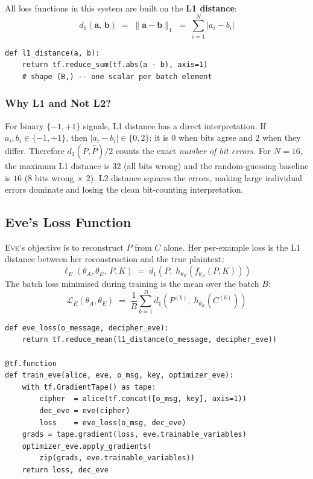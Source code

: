 \documentclass[12pt, a4paper]{article}
\newcommand{\eve}{\textsc{Eve}}
\newcommand{\thetaA}{\theta_{\!A}}
\newcommand{\thetaE}{\theta_{\!E}}
\begin{document}
All loss functions in this system are built on the \textbf{L1 distance}:
%
\begin{equation}
  d_1(\mathbf{a},\, \mathbf{b})
  \;=\; \|\mathbf{a} - \mathbf{b}\|_1
  \;=\; \sum_{i=1}^{N} |a_i - b_i|
  \label{eq:l1_full}
\end{equation}

\begin{lstlisting}[caption={L1 distance implementation}]
def l1_distance(a, b):
    return tf.reduce_sum(tf.abs(a - b), axis=1)
    # shape (B,) -- one scalar per batch element
\end{lstlisting}

\subsubsection*{Why L1 and Not L2?}

For binary $\{-1,+1\}$ signals, L1 distance has a direct interpretation.
If $a_i, b_i \in \{-1,+1\}$, then $|a_i - b_i| \in \{0, 2\}$: it is $0$
when bits agree and $2$ when they differ. Therefore $d_1(P, \hat{P})/2$
counts the exact \emph{number of bit errors}. For $N=16$, the maximum L1
distance is $32$ (all bits wrong) and the random-guessing baseline is $16$
(8 bits wrong $\times$ 2). L2 distance squares the errors, making large
individual errors dominate and losing the clean bit-counting interpretation.

\subsection{Eve's Loss Function}
\label{subsec:eve_loss}

\eve{}'s objective is to reconstruct $P$ from $C$ alone. Her per-example
loss is the L1 distance between her reconstruction and the true plaintext:
%
\begin{equation}
  \ell_E(\thetaA, \thetaE,\, P, K)
  \;=\; d_1\!\left(P,\; h_{\thetaE}\!\left(f_{\thetaA}(P,K)\right)\right)
  \label{eq:eve_loss_formal}
\end{equation}
%
The batch loss minimised during training is the mean over the batch $B$:
%
\begin{equation}
  \mathcal{L}_E(\thetaA, \thetaE)
  \;=\; \frac{1}{B} \sum_{b=1}^{B}
        d_1\!\left(P^{(b)},\; h_{\thetaE}\!\left(C^{(b)}\right)\right)
  \label{eq:eve_loss_batch}
\end{equation}
\newpage
\begin{lstlisting}[caption={Eve's loss and isolated training step}]
def eve_loss(o_message, decipher_eve):
    return tf.reduce_mean(l1_distance(o_message, decipher_eve))

@tf.function
def train_eve(alice, eve, o_msg, key, optimizer_eve):
    with tf.GradientTape() as tape:
        cipher  = alice(tf.concat([o_msg, key], axis=1))
        dec_eve = eve(cipher)
        loss    = eve_loss(o_msg, dec_eve)
    grads = tape.gradient(loss, eve.trainable_variables)
    optimizer_eve.apply_gradients(
        zip(grads, eve.trainable_variables))
    return loss, dec_eve
\end{lstlisting}
\end{document}
